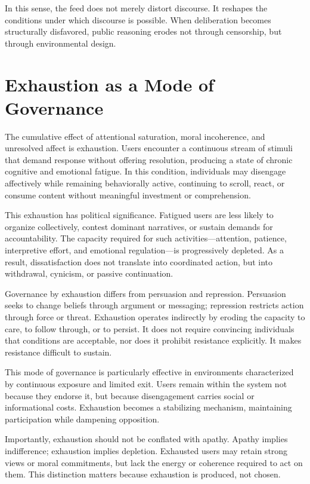 \documentclass[12pt]{article}
\begin{document}
In this sense, the feed does not merely distort discourse. It reshapes the conditions under which discourse is possible. When deliberation becomes structurally disfavored, public reasoning erodes not through censorship, but through environmental design.

\section{Exhaustion as a Mode of Governance}

The cumulative effect of attentional saturation, moral incoherence, and unresolved affect is exhaustion. Users encounter a continuous stream of stimuli that demand response without offering resolution, producing a state of chronic cognitive and emotional fatigue. In this condition, individuals may disengage affectively while remaining behaviorally active, continuing to scroll, react, or consume content without meaningful investment or comprehension.

This exhaustion has political significance. Fatigued users are less likely to organize collectively, contest dominant narratives, or sustain demands for accountability. The capacity required for such activities—attention, patience, interpretive effort, and emotional regulation—is progressively depleted. As a result, dissatisfaction does not translate into coordinated action, but into withdrawal, cynicism, or passive continuation.

Governance by exhaustion differs from persuasion and repression. Persuasion seeks to change beliefs through argument or messaging; repression restricts action through force or threat. Exhaustion operates indirectly by eroding the capacity to care, to follow through, or to persist. It does not require convincing individuals that conditions are acceptable, nor does it prohibit resistance explicitly. It makes resistance difficult to sustain.

This mode of governance is particularly effective in environments characterized by continuous exposure and limited exit. Users remain within the system not because they endorse it, but because disengagement carries social or informational costs. Exhaustion becomes a stabilizing mechanism, maintaining participation while dampening opposition.

Importantly, exhaustion should not be conflated with apathy. Apathy implies indifference; exhaustion implies depletion. Exhausted users may retain strong views or moral commitments, but lack the energy or coherence required to act on them. This distinction matters because exhaustion is produced, not chosen.
\end{document}
